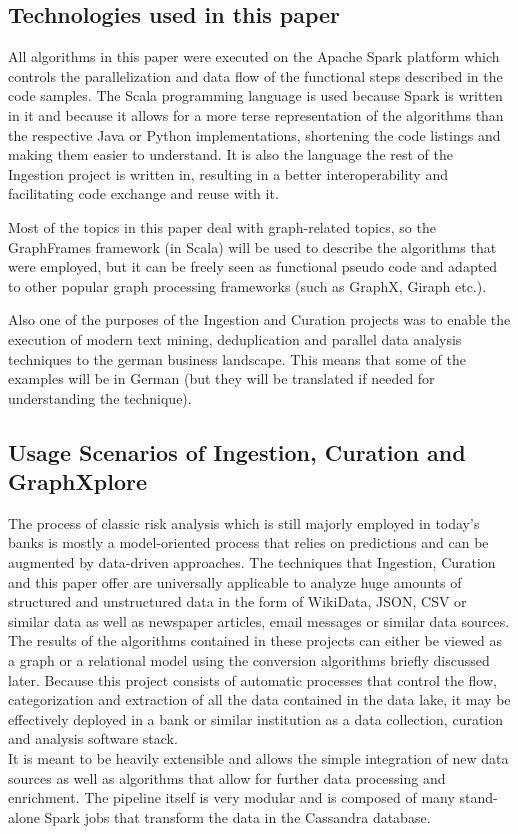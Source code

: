 \documentclass[
        a4paper,     %
        titlepage,   %
        oneside,     %
        parskip      %
]{scrartcl}          %
\begin{document}
    \subsection{Technologies used in this paper}
    All algorithms in this paper were executed on the Apache Spark platform which
    controls the parallelization and data flow of the functional steps described
    in the code samples. The Scala programming language is used because Spark is
    written in it and because it allows for a more terse representation of the
    algorithms than the respective Java or Python implementations, shortening
    the code listings and making them easier to understand. It is also the language
    the rest of the Ingestion project is written in, resulting in a better interoperability
    and facilitating code exchange and reuse with it.

    Most of the topics in this paper deal with graph-related topics, so the GraphFrames framework
    (in Scala) will be used to describe the algorithms that were employed,
    but it can be freely seen as functional pseudo code and adapted to other popular
    graph processing frameworks (such as GraphX, Giraph etc.).

    Also one of the purposes of the Ingestion and Curation projects was to enable
    the execution of modern text mining, deduplication and parallel data analysis techniques
    to the german business landscape. This means that some of the examples will be
    in German (but they will be translated if needed for understanding the technique).

    \subsection{Usage Scenarios of Ingestion, Curation and GraphXplore}
    The process of classic risk analysis which is still majorly employed in today's banks is mostly
    a model-oriented process that relies on predictions and can be augmented by data-driven approaches.
    The techniques that Ingestion, Curation and this paper offer are universally
    applicable to analyze huge amounts of structured and unstructured data
    in the form of WikiData, JSON, CSV or similar data as well as newspaper articles,
    email messages or similar data sources.\\
    The results of the algorithms contained in these projects can either be viewed as a graph or a relational model
    using the conversion algorithms briefly discussed later.
    Because this project consists of automatic processes
    that control the flow, categorization and extraction
    of all the data contained in the data lake, it may be effectively deployed in a bank
    or similar institution as a data collection, curation and analysis software stack.\\
    It is meant to be heavily extensible and allows the simple integration of new data sources %
    as well as algorithms that allow for further data processing and enrichment.
    The pipeline itself is very modular and is composed of many stand-alone
    Spark jobs that transform the data in the Cassandra database.
\end{document}
